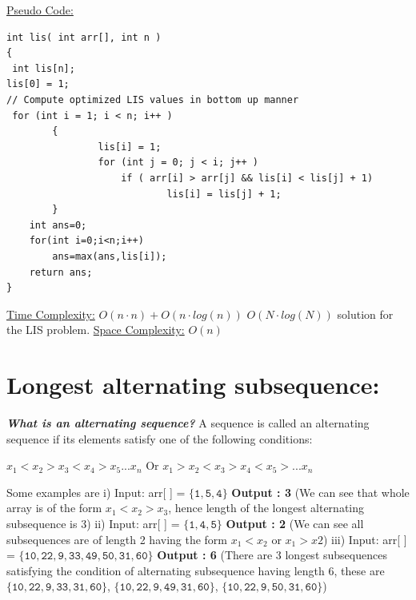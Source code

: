 \documentclass[12pt]{book}
\begin{document}
\underline{Pseudo Code:}
\begin{lstlisting}
int lis( int arr[], int n ) 
{
 int lis[n];
lis[0] = 1;	
// Compute optimized LIS values in bottom up manner 
 for (int i = 1; i < n; i++ ) 
    	{
        		lis[i] = 1;
        		for (int j = 0; j < i; j++ )  
            		if ( arr[i] > arr[j] && lis[i] < lis[j] + 1) 
                			lis[i] = lis[j] + 1; 
    	}
	int ans=0;
	for(int i=0;i<n;i++)
		ans=max(ans,lis[i]);
	return ans;
}
\end{lstlisting}
\underline{Time Complexity:}
\newline
$O(n \cdot n)+ O(n \cdot log(n))$\newline
$O(N \cdot log(N))$ solution for the LIS problem.
\newline\newline
\underline{Space Complexity:}\newline
$O(n)$
\newline\newline\newline
\section{Longest alternating subsequence:}

\textbf{\textit{What is an alternating sequence?}}\newline
A sequence is called an alternating sequence if its elements satisfy one of the following conditions:\newline
\begin{center}
$x_1 < x_2 > x_3 < x_4 > x_5 ... x_n$\newline
Or\newline
$x_1 > x_2 < x_3 > x_4 < x_5 > ... x_n$\newline
\end{center}

Some examples are\newline
i) Input: arr[ ] = $\mathtt{\{1, 5, 4\}}$\newline
   \textbf{Output : 3}\newline
   (We can see that whole array is of the form $x_1 < x_2 > x_3$, hence length of the longest alternating subsequence is 3)\newline\newline
ii) Input: arr[ ] = $\mathtt{\{1, 4, 5\}}$\newline
   \textbf{Output : 2}\newline
   (We can see all subsequences are of length 2 having the form $x_1 < x_2$ or $x_1 > x2$)\newline\newline
iii) Input: arr[ ] = $\mathtt{\{10, 22, 9, 33, 49, 50, 31, 60\}}$\newline
   \textbf{Output : 6}\newline
   (There are 3 longest subsequences satisfying the condition of alternating subsequence having length 6, these are $\mathtt{\{10,22,9,33,31,60\}}$, $\mathtt{\{10,22,9,49,31,60\}}$, $\mathtt{\{10,22,9,50,31,60\}}$)\newline\newline
\end{document}
